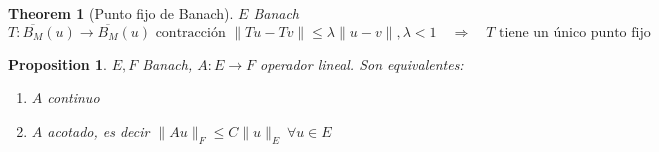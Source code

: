\documentclass[leqno]{article}
\newtheorem*{theorem}{Theorem}
\newtheorem*{proposition}{Proposition}
\begin{document}
\begin{theorem}[Punto fijo de Banach] $E$ Banach
 \[
T:\overline{B_M}(u) \to   \overline{B_M}(u) \text{ contracción } \|Tu-Tv\|\le \lambda \|u-v\|, \lambda<1 \quad \Rightarrow \quad T  \text{ tiene un único punto fijo}
\] 
\end{theorem}

\begin{proposition} $E, F$ Banach,  $A:E\to F$ operador lineal. Son equivalentes:
\begin{enumerate}[topsep=-6pt, itemsep=0pt]
  \item $A$ continuo
  \item  $A$ acotado, es decir  $\|Au\|_{F}\le C\|u\|_E \ \forall u\in E$ 
\end{enumerate} 
\end{proposition}
\end{document}
